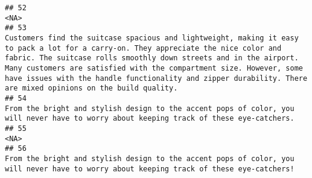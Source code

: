 \documentclass[
]{article}
\begin{document}
\begin{verbatim}
## 52                                                                                                                                                                                                                                                                                                                                                                                                                                                                                                                                                                                                                       <NA>
## 53                                                                                                                                                                                                                           Customers find the suitcase spacious and lightweight, making it easy to pack a lot for a carry-on. They appreciate the nice color and fabric. The suitcase rolls smoothly down streets and in the airport. Many customers are satisfied with the compartment size. However, some have issues with the handle functionality and zipper durability. There are mixed opinions on the build quality.
## 54                                                                                                                                                                                                                                                                                                                                                                                                                                                                                   From the bright and stylish design to the accent pops of color, you will never have to worry about keeping track of these eye-catchers. 
## 55                                                                                                                                                                                                                                                                                                                                                                                                                                                                                                                                                                                                                       <NA>
## 56                                                                                                                                                                                                                                                                                                                                                                                                                                                                                   From the bright and stylish design to the accent pops of color, you will never have to worry about keeping track of these eye-catchers! 

\end{verbatim}
\end{document}
